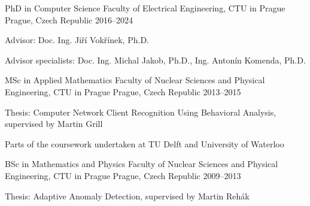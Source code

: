 

\begin{cventries}

  \cventry
    {PhD in Computer Science} %
    {Faculty of Electrical Engineering, CTU in Prague} %
    {Prague, Czech Republic} %
    {2016--2024} %
    {
      \begin{cvitems} %
        \item {Advisor: Doc. Ing. Jiří Vokřínek, Ph.D.}
        \item {Advisor specialists: Doc. Ing. Michal Jakob, Ph.D., Ing. Antonín Komenda, Ph.D.}
        \item {}
      \end{cvitems}
    }


  \cventry
    {MSc in Applied Mathematics} %
    {Faculty of Nuclear Sciences and Physical Engineering, CTU in Prague} %
    {Prague, Czech Republic} %
    {2013--2015} %
    {
      \begin{cvitems} %
        \item {Thesis: Computer Network Client Recognition Using Behavioral Analysis, supervised by Martin Grill}
        \item {Parts of the coursework undertaken at TU Delft and University of Waterloo}
      \end{cvitems}
    }

  \cventry
    {BSc in Mathematics and Physics} %
    {Faculty of Nuclear Sciences and Physical Engineering, CTU in Prague} %
    {Prague, Czech Republic} %
    {2009--2013} %
    {
      \begin{cvitems} %
        \item {Thesis: Adaptive Anomaly Detection, supervised by Martin Rehák }
      \end{cvitems}
    }

\end{cventries}
